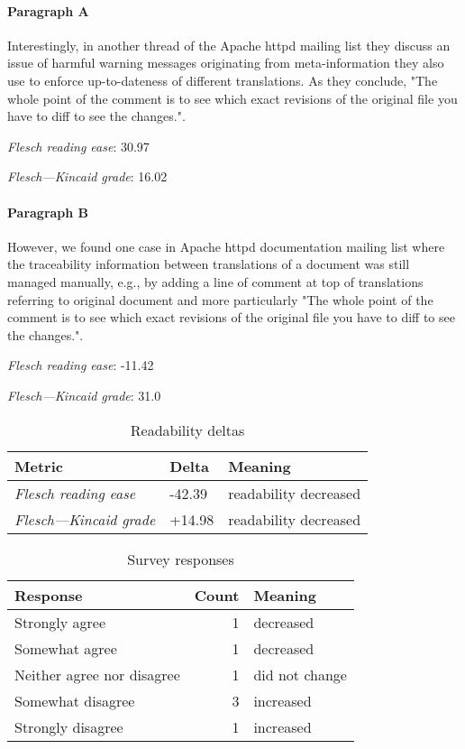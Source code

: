 \paragraph{Paragraph A}
Interestingly, in another thread of the Apache httpd mailing list they discuss an issue of harmful warning messages originating from meta-information they also use to enforce up-to-dateness of different translations. As they conclude, "The whole point of the comment is to see which exact revisions of the original file you have to diff to see the changes.".\par\medskip
\emph{Flesch reading ease}: 30.97\par
\emph{Flesch---Kincaid grade}: 16.02

\paragraph{Paragraph B}
However, we found one case in Apache httpd documentation mailing list where the traceability information between translations of a document was still managed manually, e.g., by adding a line of comment at top of translations referring to original document and more particularly "The whole point of the comment is to see which exact revisions of the original file you have to diff to see the changes.".\par\medskip
\emph{Flesch reading ease}: -11.42\par
\emph{Flesch---Kincaid grade}: 31.0

\bigskip\begin{table}[!h]
\centering
\begin{tabular}{lll}
\toprule
               \textbf{Metric} & \textbf{Delta} &       \textbf{Meaning} \\
\midrule
    \emph{Flesch reading ease} &         -42.39 &  readability decreased \\
 \emph{Flesch---Kincaid grade} &         +14.98 &  readability decreased \\
\bottomrule
\end{tabular}
\caption*{Readability deltas}\end{table}

\begin{table}[!h]
\centering
\begin{tabular}{lrl}
\toprule
          \textbf{Response} &  \textbf{Count} & \textbf{Meaning} \\
\midrule
             Strongly agree &               1 &        decreased \\
             Somewhat agree &               1 &        decreased \\
 Neither agree nor disagree &               1 &   did not change \\
          Somewhat disagree &               3 &        increased \\
          Strongly disagree &               1 &        increased \\
\bottomrule
\end{tabular}
\caption*{Survey responses}\end{table}


